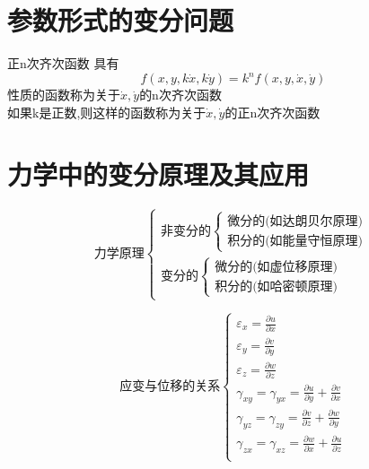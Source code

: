 \documentclass{book}
\begin{document}
\section{参数形式的变分问题}
正n次齐次函数
具有
$$
f(x,y,k\dot{x},k\dot{y})=k^nf(x,y,\dot{x},\dot{y})
$$
性质的函数称为关于$\dot{x},\dot{y}$的n次齐次函数\\
如果k是正数,则这样的函数称为关于$\dot{x},\dot{y}$的正n次齐次函数

\section{力学中的变分原理及其应用}
$$
\text{力学原理}
\left\{
	\begin{array}{ll}
	 \text{非变分的}
	 	\left\{
			\begin{array}{ll}
                    \text{微分的(如达朗贝尔原理)}\\
                    \text{积分的(如能量守恒原理)}
			\end{array}
			\right.  \\
	 \text{变分的}
	 	\left\{
			\begin{array}{ll}
                    \text{微分的(如虚位移原理)}\\
                    \text{积分的(如哈密顿原理)}
			\end{array}
			\right.
	\end{array}
	\right.
$$

\begin{equation}
\text{应变与位移的关系}
\left\{
	\begin{array}{ll}
	\varepsilon_x = \frac{\partial u}{\partial x} \\
	\varepsilon_y = \frac{\partial v}{\partial y} \\
	\varepsilon_z = \frac{\partial w}{\partial z} \\
    \gamma_{xy} = \gamma_{yx} = \frac{\partial u}{\partial y}+ \frac{\partial v}{\partial x}\\
    \gamma_{yz} = \gamma_{zy} = \frac{\partial v}{\partial z}+ \frac{\partial w}{\partial y}\\
    \gamma_{zx} = \gamma_{xz} = \frac{\partial w}{\partial x}+ \frac{\partial u}{\partial z}\\
	\end{array}
	\right.
\label{equation.cauchy}
\end{equation}
\end{document}
